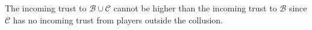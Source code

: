\begin{proofsketch}
  The incoming trust to $\mathcal{B} \cup \mathcal{C}$ cannot be higher than the incoming trust to $\mathcal{B}$ since
  $\mathcal{C}$ has no incoming trust from players outside the collusion.
\end{proofsketch}
